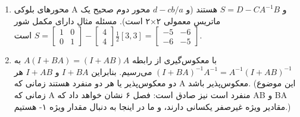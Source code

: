 \documentclass[12pt,a4paper]{article}
\begin{document}
{\begin{enumerate}
			\item محورهای بلوکی A و $S=D-CA^{-1}B$ هستند (و $d-cb/a$ محور دوم صحیح یک ماتریس معمولی ۲×۲ است). مسئله مثال دارای مکمل شور $S = \begin{bmatrix} 1 & 0 \\ 0 & 1 \end{bmatrix} - \begin{bmatrix} 4 \\ 4 \end{bmatrix} \frac{1}{2} [3, 3] = \begin{bmatrix} -5 & -6 \\ -6 & -5 \end{bmatrix}$ است.
			
			\item با معکوس‌گیری از رابطه $A(I+BA)=(I+AB)A$ به $(I+BA)^{-1}A^{-1}=A^{-1}(I+AB)^{-1}$ می‌رسیم. بنابراین $I+BA$ و $I+AB$ هر دو معکوس‌پذیر یا هر دو منفرد هستند زمانی که A معکوس‌پذیر باشد. (این موضوع زمانی که A منفرد است نیز صادق است: فصل ۶ نشان خواهد داد که AB و BA مقادیر ویژه غیرصفر یکسانی دارند، و ما در اینجا به دنبال مقدار ویژه ۱- هستیم.)
		\end{enumerate}
		
	}
\end{document}
